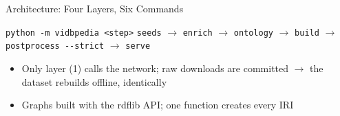 \begin{frame}{Architecture: Four Layers, Six Commands}
    \vspace{0.8em}
    \begin{block}{\texttt{python -m vidbpedia <step>}}
        \footnotesize
        \texttt{seeds} $\rightarrow$ \texttt{enrich} $\rightarrow$ \texttt{ontology}
        $\rightarrow$ \texttt{build} $\rightarrow$ \texttt{postprocess -{}-strict}
        $\rightarrow$ \texttt{serve}
    \end{block}
    \begin{itemize}
        \small
        \item Only layer (1) calls the network; raw downloads are committed
              $\rightarrow$ the dataset rebuilds \alert{offline}, identically
        \item Graphs built with the rdflib API; \alert{one function} creates every IRI
    \end{itemize}
\end{frame}
